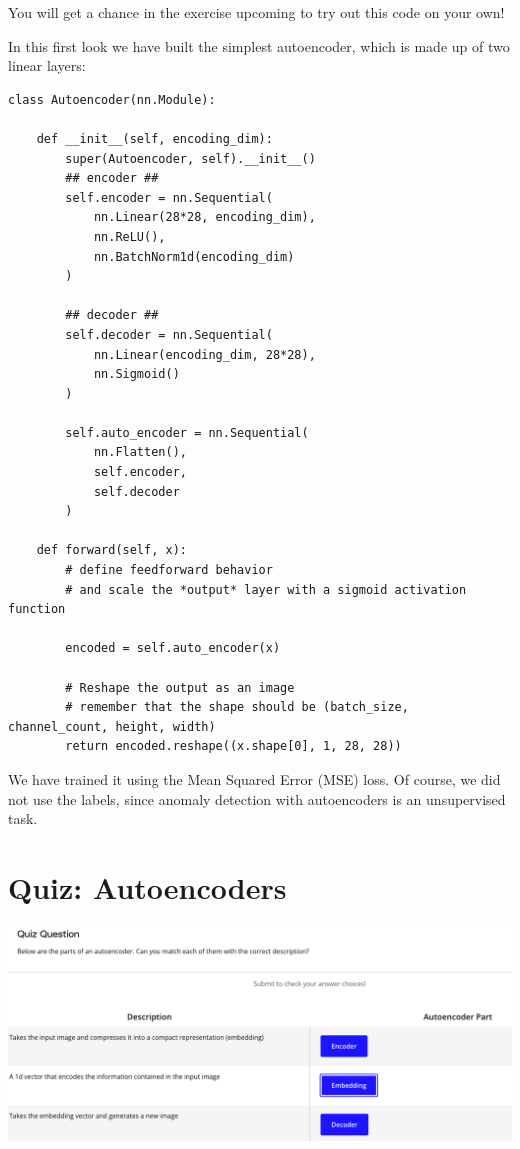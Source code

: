 You will get a chance in the exercise upcoming to try out this code on your own! \newline

In this first look we have built the simplest autoencoder, which is made up of two linear layers:
\begin{lstlisting}
class Autoencoder(nn.Module):

    def __init__(self, encoding_dim):
        super(Autoencoder, self).__init__()
        ## encoder ##
        self.encoder = nn.Sequential(
            nn.Linear(28*28, encoding_dim),
            nn.ReLU(),
            nn.BatchNorm1d(encoding_dim)
        )

        ## decoder ##
        self.decoder = nn.Sequential(
            nn.Linear(encoding_dim, 28*28),
            nn.Sigmoid()
        )

        self.auto_encoder = nn.Sequential(
            nn.Flatten(),
            self.encoder,
            self.decoder
        )

    def forward(self, x):
        # define feedforward behavior 
        # and scale the *output* layer with a sigmoid activation function

        encoded = self.auto_encoder(x)

        # Reshape the output as an image
        # remember that the shape should be (batch_size, channel_count, height, width)
        return encoded.reshape((x.shape[0], 1, 28, 28))
\end{lstlisting}
We have trained it using the Mean Squared Error (MSE) loss. Of course, we did not use the labels, since anomaly detection with autoencoders is an unsupervised task.

\section{Quiz: Autoencoders}

\includegraphics[width=1\linewidth]{img//cnn//autoencoders/image.png}

